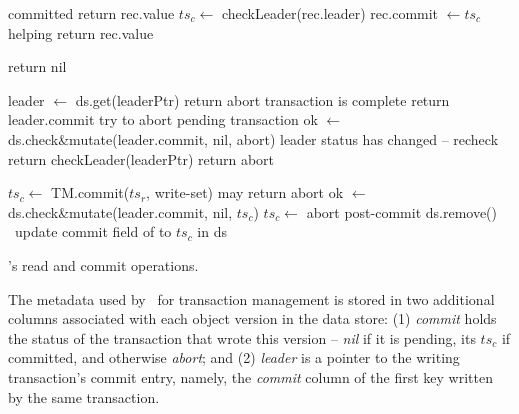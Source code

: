 \begin{algorithm}[t]
  \begin{algorithmic}
    \begin{small}
		 \Comment committed
     			   \State return rec.value \EndIf
 			\State $ts_c \leftarrow$ {\sc checkLeader}(rec.leader)
   			\State rec.commit $\leftarrow ts_c$ \Comment helping 
 			   \State return  rec.value \EndIf
      		\EndIf
      		


      \EndFor
      \State  return nil
      \EndProcedure

\Statex

      			\State leader $\leftarrow$ ds.get(leaderPtr)
     			  return abort \EndIf
		     	  \Comment transaction is complete
		     	 	\State return leader.commit 
		     	 \EndIf
		     	 \Comment try to abort pending transaction 
			\State ok $\leftarrow$ ds.check\&mutate(leader.commit, nil, abort)
			 \Comment leader status has changed -- recheck  
				\State return  {\sc checkLeader}({leaderPtr}) \EndIf
			\State return abort
	   	\EndProcedure

\Statex

      
      	\State $ts_c \leftarrow$ TM.commit($ts_r$, write-set) \Comment may return abort
	      	 \State  ok $\leftarrow$ ds.check\&mutate(leader.commit, nil,  $ts_c$)
   		 $ts_c \leftarrow$ abort \EndIf
	\EndIf
	\State \Comment post-commit
			 ds.remove()  	
			\Else\ update  commit field of  to $ts_c$  in ds%
			\EndIf
	\EndFor
\EndProcedure
      
       \end{small}
  \end{algorithmic}
  \caption{\sys's read and commit operations.} 
  \label{fig:get-pseudocode}
\end{algorithm} 

The metadata used by \sys\ for transaction management is stored in two additional columns associated with each object version in the data store:
(1) \emph{commit} holds the status of the transaction that wrote this version -- \emph{nil} if it is pending, its  $ts_c$ if committed, and 
otherwise \emph{abort}; 
and
(2) \emph{leader} is a pointer to the writing transaction's commit entry, namely, the \emph{commit} column of the first key written by the same
transaction. 

